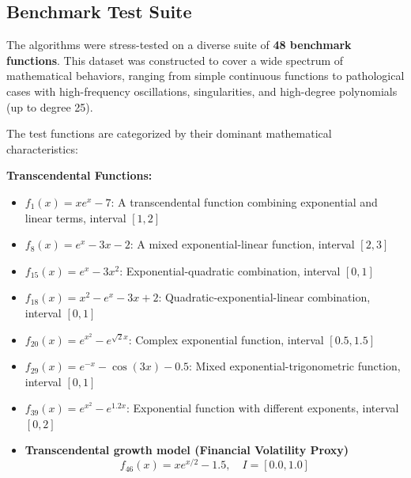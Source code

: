 \documentclass[amsmath, amssymb, aps]{revtex4-2}
\begin{document}
\subsection{Benchmark Test Suite}

The algorithms were stress-tested on a diverse suite of \textbf{48 benchmark functions}. This dataset was constructed to cover a wide spectrum of mathematical behaviors, ranging from simple continuous functions to pathological cases with high-frequency oscillations, singularities, and high-degree polynomials (up to degree 25).

The test functions are categorized by their dominant mathematical characteristics:

\textbf{Transcendental Functions:}
\begin{itemize}
\item $f_1(x) = x e^x - 7$: A transcendental function combining exponential and linear terms, interval $[1, 2]$
\item $f_8(x) = e^x - 3x - 2$: A mixed exponential-linear function, interval $[2, 3]$
\item $f_{15}(x) = e^x - 3x^2$: Exponential-quadratic combination, interval $[0, 1]$
\item $f_{18}(x) = x^2 - e^x - 3x + 2$: Quadratic-exponential-linear combination, interval $[0, 1]$
\item $f_{20}(x) = e^{x^2} - e^{\sqrt{2}x}$: Complex exponential function, interval $[0.5, 1.5]$
\item $f_{29}(x) = e^{-x} - \cos(3x) - 0.5$: Mixed exponential-trigonometric function, interval $[0, 1]$
\item $f_{39}(x) = e^{x^2} - e^{1.2x}$: Exponential function with different exponents, interval $[0, 2]$
\item \textbf{Transcendental growth model (Financial Volatility Proxy)}\[ f_{46}(x) = x e^{x/2} - 1.5, \quad I = [0.0, 1.0] \]
\end{itemize}
\end{document}
